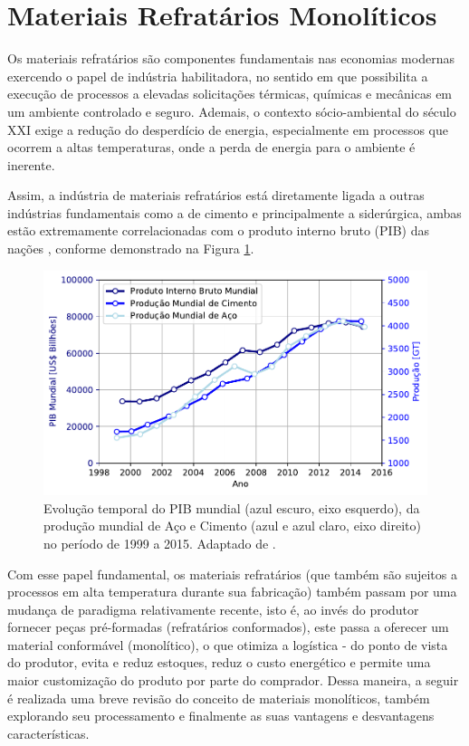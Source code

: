 
\section{Materiais Refratários Monolíticos}\label{mono}

Os materiais refratários são componentes fundamentais nas economias modernas
exercendo o papel de indústria habilitadora, no sentido em que possibilita a
execução de processos a elevadas solicitações térmicas, químicas e mecânicas em
um ambiente controlado e seguro. Ademais, o contexto sócio-ambiental do século
XXI exige a redução do desperdício de energia, especialmente em processos que
ocorrem a altas temperaturas, onde a perda de energia para o ambiente é
inerente.

Assim, a indústria de materiais refratários está diretamente ligada a outras
indústrias fundamentais como a de cimento e principalmente a siderúrgica, ambas
estão extremamente correlacionadas com o produto interno bruto (PIB) das nações
\cite{Ravazzolo2017, Bordigoni2016, Dobrota2013}, conforme demonstrado na
Figura \ref{fig:refractory_economy}.

\begin{figure}[!ht]
\centering
\includegraphics[width=\linewidth]{./figures/refractory_economy.pdf}
\caption{Evolução temporal do PIB mundial (azul escuro, eixo esquerdo), da
  produção mundial de Aço e Cimento (azul e azul claro, eixo direito) no período
  de 1999 a 2015. Adaptado de
  \cite{GlobalRef2017}. \label{fig:refractory_economy}}
\end{figure}

Com esse papel fundamental, os materiais refratários (que também são sujeitos a
processos em alta temperatura durante sua fabricação) também passam por uma
mudança de paradigma relativamente recente, isto é, ao invés do produtor
fornecer peças pré-formadas (refratários conformados), este passa a oferecer um
material conformável (monolítico), o que otimiza a logística - do ponto de vista
do produtor, evita e reduz estoques, reduz o custo energético e permite uma
maior customização do produto por parte do comprador. Dessa maneira, a seguir é
realizada uma breve revisão do conceito de materiais monolíticos, também
explorando seu processamento e finalmente as suas vantagens e desvantagens
características.

